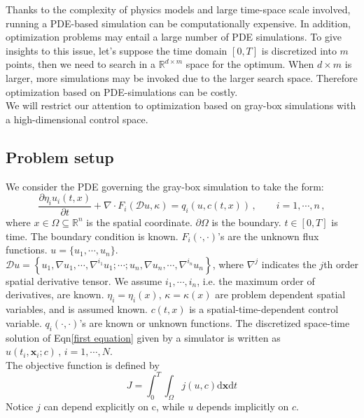 \documentclass[a4paper,onecolumn]{article}
\theoremstyle{remark}
\begin{document}
\noindent Thanks to the complexity of physics models and large time-space scale involved, 
running a PDE-based simulation can be computationally expensive. 
In addition, optimization problems may entail a large number of 
PDE simulations. To give insights to this issue, let's suppose the time domain $[0,T]$ is discretized into $m$ points, 
then we need to search in a $\mathbb{R}^{d\times m}$
space for the optimum. When $d\times m$ is larger, more simulations may be invoked due to the larger search space.
Therefore optimization based on PDE-simulations can be costly.\\

\noindent We will restrict our attention to optimization based on gray-box simulations with a high-dimensional control space.

\subsection{Problem setup}
\label{psetup}
We consider the PDE governing the gray-box simulation to take the form:
\begin{equation}
    \frac{\partial\eta_i u_i(t,x)}{\partial t} + \nabla \cdot 
    F_i(\mathcal{D} u, \kappa) 
    = q_i(u,c(t,x))\,, \qquad i=1,\cdots, n\,,
    \label{first equation}
\end{equation}
where $x\in \Omega \subseteq \mathbb{R}^{n}$ is the spatial coordinate.
$\partial \Omega$ is the boundary. $t\in[0,T]$ is time.
The boundary condition is known. $F_i(\cdot, \cdot)$'s are the unknown flux functions. 
$u = \{u_1, \cdots, u_n\}$.\\
$\mathcal{D} u = \left\{u_1, \nabla u_1 , \cdots, \nabla^{i_1} u_1; \cdots;
u_n, \nabla u_n,\cdots, \nabla^{i_n} u_n\right\}$, where $\nabla^j$ indicates the $j$th
order spatial derivative tensor. We assume $i_1,\cdots, i_n$, i.e. the maximum 
order of derivatives, are known.
$\eta_i=\eta_i(x), \,\kappa=\kappa(x)$ are 
problem dependent spatial variables, and is assumed known. $c(t,x)$ is a spatial-time-dependent control variable.
$q_i(\cdot,\cdot)$'s are known or unknown functions.
The discretized space-time solution of Eqn\eqref{first equation} given by a simulator
is written as $\hat{u}(t_i, \mathbf{x}_i; c)\,,\, i=1,\cdots,N$.\\

\noindent The objective function is defined by
\begin{equation}
    J = \int_0^T \int_\Omega j(u,c) \textrm{d}\mathbf{x}\textrm{d}t
\end{equation}
Notice $j$ can depend explicitly on c, while $u$ depends implicitly on $c$.\\
\end{document}
